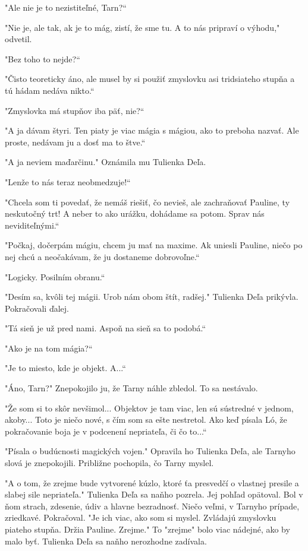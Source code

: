 \documentclass{book}
\begin{document}
"$ $Ale nie je to nezistiteľné, Tarn?“

"$ $Nie je, ale tak, ak je to mág, zistí, že sme tu. A to nás pripraví o výhodu,"$ $ odvetil.

"$ $Bez toho to nejde?“

"$ $Čisto teoreticky áno, ale musel by si použiť zmyslovku asi tridsiateho stupňa a tú hádam nedáva nikto.“

"$ $Zmyslovka má stupňov iba päť, nie?“

"$ $A ja dávam štyri. Ten piaty je viac mágia s mágiou, ako to preboha nazvať. Ale proste, nedávam ju a dosť ma to štve.“

"$ $A ja neviem maďarčinu."$ $ Oznámila mu Tulienka Deľa.

"$ $Lenže to nás teraz neobmedzuje!“

"$ $Chcela som ti povedať, že nemáš riešiť, čo nevieš, ale zachraňovať Pauline, ty neskutočný trt! A neber to ako urážku, dohádame sa potom. Sprav nás neviditeľnými.“

"$ $Počkaj, dočerpám mágiu, chcem ju mať na maxime. Ak uniesli Pauline, niečo po nej chcú a neočakávam, že ju dostaneme dobrovoľne.“

"$ $Logicky. Posilním obranu.“

"$ $Desím sa, kvôli tej mágii. Urob nám obom štít, radšej."$ $ Tulienka Deľa prikývla. Pokračovali ďalej.

"$ $Tá sieň je už pred nami. Aspoň na sieň sa to podobá.“

"$ $Ako je na tom mágia?“

"$ $Je to miesto, kde je objekt. A...“

"$ $Áno, Tarn?"$ $ Znepokojilo ju, že Tarny náhle zbledol. To sa nestávalo.

"$ $Že som si to skôr nevšimol... Objektov je tam viac, len sú sústredné v jednom, akoby... Toto je niečo nové, s čím som sa ešte nestretol. Ako keď písala Ló, že pokračovanie boja je v podcenení nepriateľa, či čo to...“

"$ $Písala o budúcnosti magických vojen."$ $ Opravila ho Tulienka Deľa, ale Tarnyho slová je znepokojili. Približne pochopila, čo Tarny myslel.

"$ $A o tom, že zrejme bude vytvorené kúzlo, ktoré ťa presvedčí o vlastnej presile a slabej sile nepriateľa."$ $ Tulienka Deľa sa naňho pozrela. Jej pohľad opätoval. Bol v ňom strach, zdesenie, údiv a hlavne bezradnosť. Niečo veľmi, v Tarnyho prípade, zriedkavé. Pokračoval. "$ $Je ich viac, ako som si myslel. Zvládajú zmyslovku piateho stupňa. Držia Pauline. Zrejme."$ $ To "$ $zrejme"$ $ bolo viac nádejné, ako by malo byť. Tulienka Deľa sa naňho nerozhodne zadívala.
\end{document}
